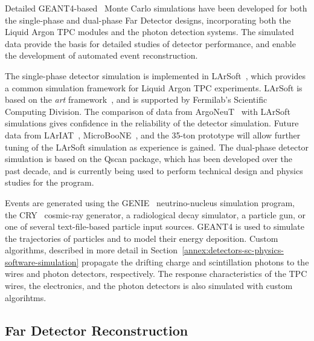 Detailed GEANT4-based~\cite{Agostinelli:2002hh,Allison:2006ve} Monte Carlo simulations have been 
developed for both the single-phase and dual-phase Far Detector designs,
incorporating both the Liquid Argon TPC modules
and the photon detection systems. The simulated data provide
the basis for detailed studies of detector performance, 
and enable the development of automated event reconstruction.

The single-phase detector simulation is implemented in LArSoft~\cite{Church:2013hea},
which provides a common simulation framework for Liquid Argon TPC experiments.
LArSoft is based on the {\it art} framework~\cite{Green:2012gv}, and is supported by Fermilab's
Scientific Computing Division.
The comparison of data from ArgoNeuT~\cite{Anderson:2012vc} with LArSoft
simulations gives confidence in the reliability of the detector simulation.
Future data from LArIAT~\cite{Adamson:2013/02/28tla,Cavanna:2014iqa},
MicroBooNE~\cite{Chen:2007ae,Jones:2011ci}, and the 35-ton prototype will allow
further tuning of the LArSoft simulation as experience is gained.
The dual-phase detector simulation is based on the Qscan package,
which has been developed over the past decade, and is currently
being used to perform technical design and physics studies for
the \cerndualproto{} program.

Events are generated using the GENIE~\cite{Andreopoulos:2009rq} neutrino-nucleus
simulation program, the CRY~\cite{cry} cosmic-ray generator, a
radiological decay simulator, a particle gun, or one of several
text-file-based particle input sources.  GEANT4 is used to simulate the trajectories
of particles and to model their energy deposition.  Custom algorithms, described
in more detail in Section~\ref{annex:detectors-sc-physics-software-simulation} propagate
the drifting charge and scintillation photons to the wires and photon detectors, respectively.
The response characteristics of the TPC wires, the electronics, and the photon detectors
is also simulated with custom algorihtms.


\subsection{Far Detector Reconstruction}
\label{sec:detectors-sc-physics-software-reconstruction-fd}

